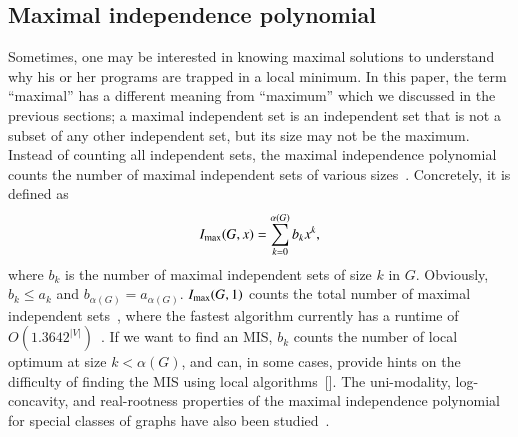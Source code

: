 \documentclass[onefignum, onetabnum]{siamart190516}
\newcommand{\<}{\langle}
\renewcommand{\>}{\rangle}
\newcommand{\red}[1]{[{\bf  \color{red}{ST: #1}}]}
\begin{document}
\subsection{Maximal independence polynomial}
Sometimes, one may be interested in knowing maximal solutions to understand why his or her programs are trapped in a local minimum.
In this paper, the term ``maximal'' has a different meaning from ``maximum''  which we discussed in the previous sections; a maximal independent set is an independent set that is not a subset of any other independent set, but its size may not be the maximum.
Instead of counting all independent sets, the maximal independence polynomial counts the number of maximal independent sets of various sizes~\cite{Hu2017}.
 Concretely, it is defined as
\begin{equation}
I_{\rm max}(G, x) = \sum_{k=0}^{\alpha(G)} b_k x^k,
\end{equation}
where $b_k$ is the number of maximal independent sets of size $k$ in $G$.
Obviously, $b_{k} \leq a_{k}$ and $b_{\alpha(G)} = a_{\alpha(G)}$. $I_{\rm max}(G, 1)$ counts the total number of maximal independent sets~\cite{Gaspers2012, Manne2013}, where the fastest algorithm currently has a runtime of $O(1.3642^{|V|})$~\cite{Gaspers2012}.
If we want to find an MIS, $b_{k}$ counts the number of local optimum at size $k < \alpha(G)$, and can, in some cases, provide hints on the difficulty of finding the MIS using local algorithms~\red{cite experiment}.
The uni-modality, log-concavity, and real-rootness properties of the maximal independence polynomial for special classes of graphs have also been studied~\cite{Hu2017}. 
\end{document}
